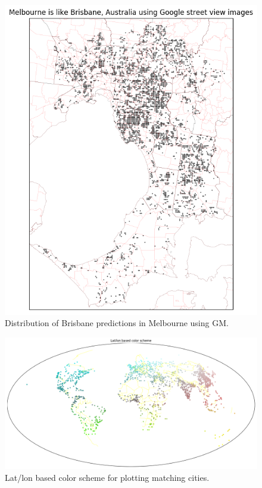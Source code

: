 \documentclass[sageh,times]{sagej}
\begin{document}
\begin{figure}[!htbp]
\centering    
\includegraphics[scale=0.25]{Images/Melbourne_Brisbane,Australia-GM.png} 
\caption{Distribution of Brisbane predictions in Melbourne using GM.}    
 \label{fig:gm_mel_bris}  
\end{figure} 


\begin{figure}[!htbp]
\centering    
\includegraphics[scale=0.25]{Images/World_map_color_scheme.png} 
\caption{Lat/lon based color scheme for plotting matching cities.}    
 \label{fig:colorscheme}  
\end{figure} 
\end{document}
